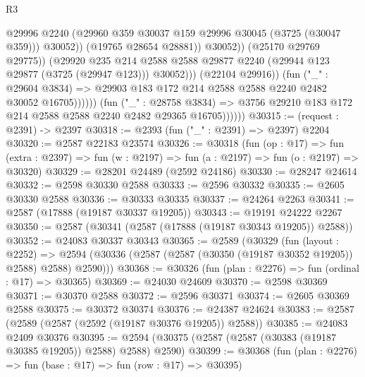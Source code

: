 \begin{lexlean}{R3}
\begin{coremodule}
                                          @29996
                                          @2240
                                          (@29960
                                            @359
                                            @30037
                                            @159
                                            @29996
                                            @30045
                                            (@3725 (@30047 @359)))
                                          @30052))
                                      (@19765 @28654 @28881))
                                    @30052))
                                (@25170 @29769 @29775))
                              (@29920
                                @235
                                @214
                                @2588
                                @2588
                                @29877
                                @2240
                                (@29944 @123 @29877 (@3725 (@29947 @123)))
                                @30052)))
                          (@22104 @29916))
                        (fun ("_" : @29604 @3834) =>
                        @29903 @183 @172 @214 @2588 @2588 @2240 @2482 @30052 @16705))))))
              (fun ("_" : @28758 @3834) =>
              @3756 @29210 @183 @172 @214 @2588 @2588 @2240 @2482 @29365 @16705))))))
@30315 := (request : @2391) -> @2397
@30318 := @2393 (fun ("_" : @2391) => @2397) @2204
@30320 := @2587 @22183 @23574
@30326 := @30318
    (fun (op : @17) =>
    fun (extra : @2397) => fun (w : @2197) => fun (a : @2197) => fun (o : @2197) => @30320)
@30329 := @28201 @24489 (@2592 @24186)
@30330 := @28247 @24614
@30332 := @2598 @30330 @2588
@30333 := @2596 @30332
@30335 := @2605 @30330 @2588
@30336 := @30333 @30335
@30337 := @24264 @2263
@30341 := @2587 (@17888 (@19187 @30337 @19205))
@30343 := @19191 @24222 @2267
@30350 := @2587 (@30341 (@2587 (@17888 (@19187 @30343 @19205)) @2588))
@30352 := @24083 @30337 @30343
@30365 := @2589
    (@30329
      (fun (layout : @2252) =>
      @2594 (@30336 (@2587 (@2587 (@30350 (@19187 @30352 @19205)) @2588) @2588) @2590)))
@30368 := @30326 (fun (plan : @2276) => fun (ordinal : @17) => @30365)
@30369 := @24030 @24609
@30370 := @2598 @30369
@30371 := @30370 @2588
@30372 := @2596 @30371
@30374 := @2605 @30369 @2588
@30375 := @30372 @30374
@30376 := @24387 @24624
@30383 := @2587 (@2589 (@2587 (@2592 (@19187 @30376 @19205)) @2588))
@30385 := @24083 @2409 @30376
@30395 := @2594 (@30375 (@2587 (@2587 (@30383 (@19187 @30385 @19205)) @2588) @2588) @2590)
@30399 := @30368 (fun (plan : @2276) => fun (base : @17) => fun (row : @17) => @30395)

\end{coremodule}
\end{lexlean}
